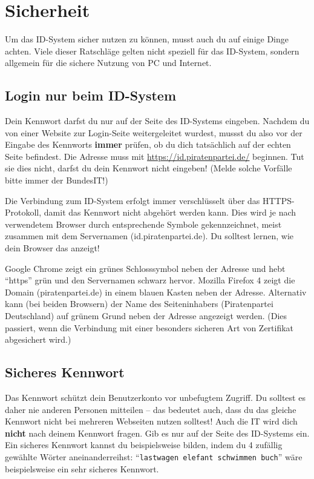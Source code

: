 \newpage
\section{Sicherheit}
Um das ID-System sicher nutzen zu können, musst auch du auf einige Dinge achten.
Viele dieser Ratschläge gelten nicht speziell für das ID-System, sondern allgemein für die sichere Nutzung von PC und Internet.

\subsection{Login nur beim ID-System}
Dein Kennwort darfst du nur auf der Seite des ID-Systems eingeben.
Nachdem du von einer Website zur Login-Seite weitergeleitet wurdest, mussst du also vor der Eingabe des Kennworts \textbf{immer} prüfen,
ob du dich tatsächlich auf der echten Seite befindest.
Die Adresse muss mit \url{https://id.piratenpartei.de/} beginnen. Tut sie dies nicht, darfst du dein Kennwort nicht eingeben!
(Melde solche Vorfälle bitte immer der BundesIT!)

Die Verbindung zum ID-System erfolgt immer verschlüsselt über das HTTPS-Protokoll, damit das Kennwort nicht abgehört werden kann.
Dies wird je nach verwendetem Browser durch entsprechende Symbole gekennzeichnet, meist zusammen mit dem Servernamen (id.piratenpartei.de).
Du solltest lernen, wie dein Browser das anzeigt!

Google Chrome zeigt ein grünes Schlosssymbol neben der Adresse und hebt "`https"' grün und den Servernamen schwarz hervor.
Mozilla Firefox 4 zeigt die Domain (piratenpartei.de) in einem blauen Kasten neben der Adresse.
Alternativ kann (bei beiden Browsern) der Name des Seiteninhabers (Piratenpartei Deutschland) auf grünem Grund neben der Adresse angezeigt werden.
(Dies passiert, wenn die Verbindung mit einer besonders sicheren Art von Zertifikat abgesichert wird.)

\subsection{Sicheres Kennwort}
Das Kennwort schützt dein Benutzerkonto vor unbefugtem Zugriff.
Du solltest es daher nie anderen Personen mitteilen -- das bedeutet auch, dass du das gleiche Kennwort nicht bei mehreren Webseiten nutzen solltest!
Auch die IT wird dich \textbf{nicht} nach deinem Kennwort fragen. Gib es nur auf der Seite des ID-Systems ein.
Ein sicheres Kennwort kannst du beispielsweise bilden, indem du 4 zufällig gewählte Wörter aneinanderreihst:
"`\texttt{lastwagen elefant schwimmen buch}"' wäre beispielsweise ein sehr sicheres Kennwort.

